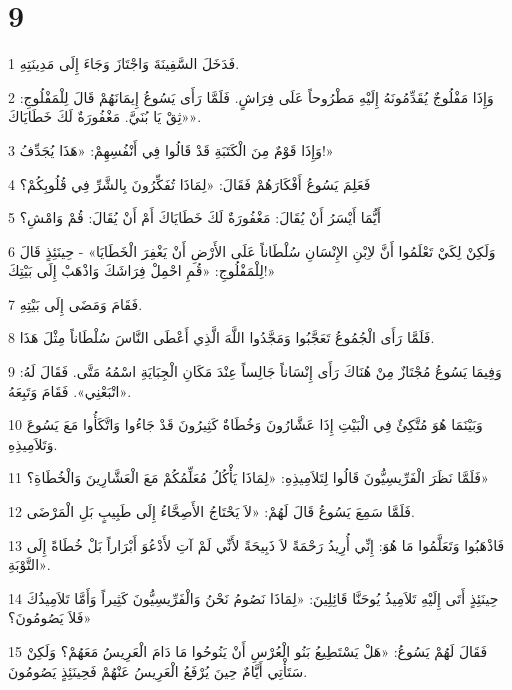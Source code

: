 \chapter{9}

\par 1 فَدَخَلَ السَّفِينَةَ وَاجْتَازَ وَجَاءَ إِلَى مَدِينَتِهِ.
\par 2 وَإِذَا مَفْلُوجٌ يُقَدِّمُونَهُ إِلَيْهِ مَطْرُوحاً عَلَى فِرَاشٍ. فَلَمَّا رَأَى يَسُوعُ إِيمَانَهُمْ قَالَ لِلْمَفْلُوجِ: «ثِقْ يَا بُنَيَّ. مَغْفُورَةٌ لَكَ خَطَايَاكَ».
\par 3 وَإِذَا قَوْمٌ مِنَ الْكَتَبَةِ قَدْ قَالُوا فِي أَنْفُسِهِمْ: «هَذَا يُجَدِّفُ!»
\par 4 فَعَلِمَ يَسُوعُ أَفْكَارَهُمْ فَقَالَ: «لِمَاذَا تُفَكِّرُونَ بِالشَّرِّ فِي قُلُوبِكُمْ؟
\par 5 أَيُّمَا أَيْسَرُ أَنْ يُقَالَ: مَغْفُورَةٌ لَكَ خَطَايَاكَ أَمْ أَنْ يُقَالَ: قُمْ وَامْشِ؟
\par 6 وَلَكِنْ لِكَيْ تَعْلَمُوا أَنَّ لاِبْنِ الإِنْسَانِ سُلْطَاناً عَلَى الأَرْضِ أَنْ يَغْفِرَ الْخَطَايَا» - حِينَئِذٍ قَالَ لِلْمَفْلُوجِ: «قُمِ احْمِلْ فِرَاشَكَ وَاذْهَبْ إِلَى بَيْتِكَ!»
\par 7 فَقَامَ وَمَضَى إِلَى بَيْتِهِ.
\par 8 فَلَمَّا رَأَى الْجُمُوعُ تَعَجَّبُوا وَمَجَّدُوا اللَّهَ الَّذِي أَعْطَى النَّاسَ سُلْطَاناً مِثْلَ هَذَا.
\par 9 وَفِيمَا يَسُوعُ مُجْتَازٌ مِنْ هُنَاكَ رَأَى إِنْسَاناً جَالِساً عِنْدَ مَكَانِ الْجِبَايَةِ اسْمُهُ مَتَّى. فَقَالَ لَهُ: «اتْبَعْنِي». فَقَامَ وَتَبِعَهُ.
\par 10 وَبَيْنَمَا هُوَ مُتَّكِئٌ فِي الْبَيْتِ إِذَا عَشَّارُونَ وَخُطَاةٌ كَثِيرُونَ قَدْ جَاءُوا وَاتَّكَأُوا مَعَ يَسُوعَ وَتَلاَمِيذِهِ.
\par 11 فَلَمَّا نَظَرَ الْفَرِّيسِيُّونَ قَالُوا لِتَلاَمِيذِهِ: «لِمَاذَا يَأْكُلُ مُعَلِّمُكُمْ مَعَ الْعَشَّارِينَ وَالْخُطَاةِ؟»
\par 12 فَلَمَّا سَمِعَ يَسُوعُ قَالَ لَهُمْ: «لاَ يَحْتَاجُ الأَصِحَّاءُ إِلَى طَبِيبٍ بَلِ الْمَرْضَى.
\par 13 فَاذْهَبُوا وَتَعَلَّمُوا مَا هُوَ: إِنِّي أُرِيدُ رَحْمَةً لاَ ذَبِيحَةً لأَنِّي لَمْ آتِ لأَدْعُوَ أَبْرَاراً بَلْ خُطَاةً إِلَى التَّوْبَةِ».
\par 14 حِينَئِذٍ أَتَى إِلَيْهِ تَلاَمِيذُ يُوحَنَّا قَائِلِينَ: «لِمَاذَا نَصُومُ نَحْنُ وَالْفَرِّيسِيُّونَ كَثِيراً وَأَمَّا تَلاَمِيذُكَ فَلاَ يَصُومُونَ؟»
\par 15 فَقَالَ لَهُمْ يَسُوعُ: «هَلْ يَسْتَطِيعُ بَنُو الْعُرْسِ أَنْ يَنُوحُوا مَا دَامَ الْعَرِيسُ مَعَهُمْ؟ وَلَكِنْ سَتَأْتِي أَيَّامٌ حِينَ يُرْفَعُ الْعَرِيسُ عَنْهُمْ فَحِينَئِذٍ يَصُومُونَ.
